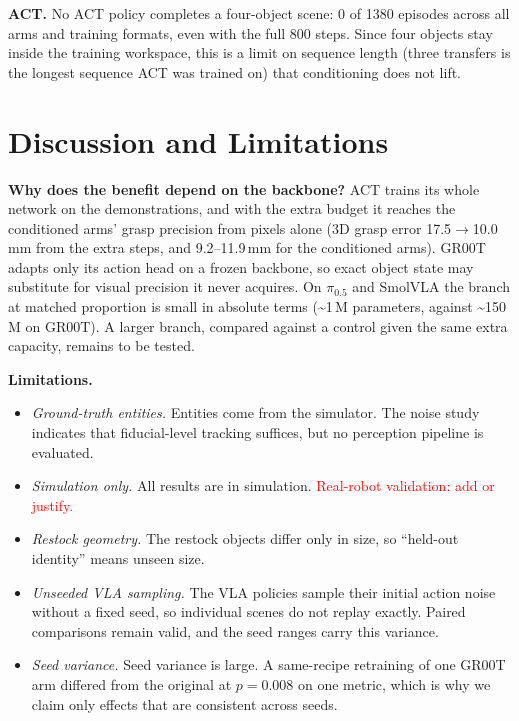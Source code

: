 \documentclass[letterpaper, 10pt, journal, twoside]{IEEEtran}
\begin{document}
\textbf{ACT.} No ACT policy completes a four-object scene: 0 of 1380
episodes across all arms and training formats, even with the full 800
steps. Since four objects stay inside the training workspace, this is a
limit on sequence length (three transfers is the longest sequence ACT was
trained on) that conditioning does not lift.

\section{Discussion and Limitations}
\label{sec:discussion}

\textbf{Why does the benefit depend on the backbone?} ACT trains its whole
network on the demonstrations, and with the extra budget it reaches the
conditioned arms' grasp precision from pixels alone (3D grasp error
17.5$\rightarrow$10.0\,mm from the extra steps, and 9.2--11.9\,mm for the
conditioned arms). GR00T adapts only its action head on a frozen backbone,
so exact object state may substitute for visual precision it never acquires.
On $\pi_{0.5}$ and SmolVLA the branch at matched proportion is small in
absolute terms (\textasciitilde1\,M parameters, against
\textasciitilde150\,M on GR00T). A larger branch, compared against a control
given the same extra capacity, remains to be tested.

\textbf{Limitations.}
\begin{itemize}
  \item \emph{Ground-truth entities.} Entities come from the simulator. The
    noise study indicates that fiducial-level tracking suffices, but no
    perception pipeline is evaluated.
  \item \emph{Simulation only.} All results are in simulation.
    \textcolor{red}{Real-robot validation: add or justify.}
  \item \emph{Restock geometry.} The restock objects differ only in size,
    so ``held-out identity'' means unseen size.
  \item \emph{Unseeded VLA sampling.} The VLA policies sample their initial
    action noise without a fixed seed, so individual scenes do not replay
    exactly. Paired comparisons remain valid, and the seed ranges carry
    this variance.
  \item \emph{Seed variance.} Seed variance is large. A same-recipe
    retraining of one GR00T arm differed from the original at $p=0.008$ on
    one metric, which is why we claim only effects that are consistent
    across seeds.
\end{itemize}
\end{document}

